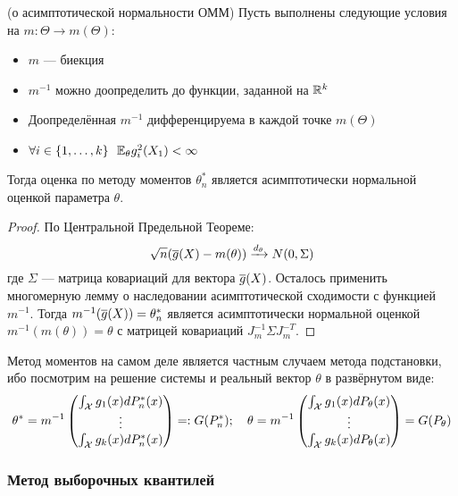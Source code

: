 \begin{theorem} (о асимптотической нормальности ОММ)
	Пусть выполнены следующие условия на $m \colon \Theta \to m(\Theta)$:
	\begin{itemize}
		\item $m$ --- биекция
		
		\item $m^{-1}$ можно доопределить до функции, заданной на $\mathbb{R}^k$
		
		\item Доопределённая $m^{-1}$ дифференцируема в каждой точке $m(\Theta)$
		
		\item $\forall i \in \range{1}{k}\ \ \E_\theta g_i^2(X_1) < \infty$
	\end{itemize}
	Тогда оценка по методу моментов $\theta_n^*$ является асимптотически нормальной оценкой параметра $\theta$.
\end{theorem}


\begin{proof}
	По Центральной Предельной Теореме:
	\[
		\sqrt{n}(\overline{g}(X) - m(\theta)) \xrightarrow{d_\theta} N(0, \Sigma)
	\]
	где $\Sigma$ --- матрица ковариаций для вектора $\overline{g}(X)$. Осталось применить многомерную лемму о наследовании асимптотической сходимости с функцией $m^{-1}$. Тогда $m^{-1}(\overline{g}(X)) = \theta_n^*$ является асимптотически нормальной оценкой $m^{-1}(m(\theta)) = \theta$ с матрицей ковариаций $J_m^{-1}\Sigma J_m^{-T}$.
\end{proof}

\begin{note}
	Метод моментов на самом деле является частным случаем метода подстановки, ибо посмотрим на решение системы и реальный вектор $\theta$ в развёрнутом виде:
	\[
		\theta^* = m^{-1} \begin{pmatrix}
			\int_{\mathcal{X}} g_1(x)dP_n^*(x)
			\\
			\vdots
			\\
			\int_{\mathcal{X}} g_k(x)dP_n^*(x)
		\end{pmatrix}
		=: G(P_n^*); \quad \theta = m^{-1} \begin{pmatrix}
			\int_{\mathcal{X}} g_1(x)dP_\theta(x)
			\\
			\vdots
			\\
			\int_{\mathcal{X}} g_k(x)dP_\theta(x)
		\end{pmatrix}
		= G(P_\theta)
	\]
\end{note}

\subsubsection*{Метод выборочных квантилей}

